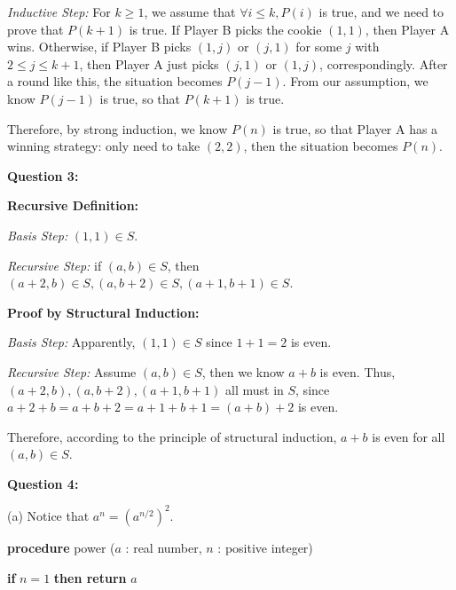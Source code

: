 \documentclass[a4paper,11pt]{article}
\begin{document}
\begin{spacing}{1.4}
    \textit{Inductive Step:}
    For $k\ge 1$, we assume that $\forall i\le k, P(i)$ is true,
    and we need to prove that $P(k+1)$ is true. If Player B
    picks the cookie $(1,1)$, then Player A wins. Otherwise, if Player
    B picks $(1,j)$ or $(j,1)$ for some $j$ with $2\le j\le k+1$,
    then Player A just picks $(j,1)$ or $(1,j)$, correspondingly.
    After a round like this, the situation becomes $P(j-1)$. 
    From our assumption, we know $P(j-1)$ is true, so that $P(k+1)$
    is true.

    Therefore, by strong induction, we know $P(n)$ is true, so that 
    Player A has a winning strategy: only need to take $(2,2)$, 
    then the situation becomes $P(n)$.

    \vspace{20pt}

    \setlength{\parindent}{0em}

    \textbf{Question 3:}

    \textbf{Recursive Definition:}

    \hspace{2em} \textit{Basis Step:} $(1, 1)\in S$.

    \hspace{2em} \textit{Recursive Step:} 
    if $(a, b)\in S$, then $(a+2, b)\in S, (a, b+2) \in S, (a+1, b+1)\in S$.


    \textbf{Proof by Structural Induction:}

    \hspace{2em} \textit{Basis Step:} 
    Apparently, $(1, 1)\in S$ since $1+1=2$ is even.
    
    \hspace{2em} \textit{Recursive Step:} 
    Assume $(a,b)\in S$, then we know $a+b$ is even. Thus, 
    $(a+2, b), (a, b+2),  (a+1, b+1)$ all must in $S$, since
    $a+2+b=a+b+2=a+1+b+1=(a+b)+2$ is even.

    Therefore, according to the principle of structural induction,
    $a+b$ is even for all $(a,b)\in S$.


    \vspace{20pt}

    \textbf{Question 4:}

    (a) Notice that $a^{n}=(a^{n/2})^2.$

    \setlength{\parindent}{4em}

    \textbf{procedure} power ($a$ : real number, $n$ : positive integer) 
    
    \textbf{if} $n = 1$ \textbf{then return} $a$


\end{spacing}
\end{document}
